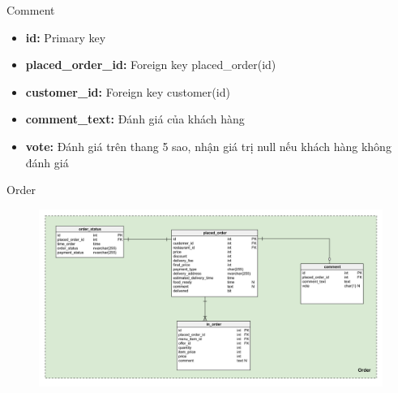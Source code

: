 \documentclass[aspectratio=43,xcolor=dvipsnames]{beamer}
\begin{document}
	\begin{frame}{Comment}
		\begin{itemize}
			\item \textbf{id:} Primary key
			\item \textbf{placed\_order\_id:} Foreign key placed\_order(id)
			\item \textbf{customer\_id:} Foreign key customer(id)
			\item \textbf{comment\_text:} Đánh giá của khách hàng
			\item \textbf{vote:} Đánh giá trên thang 5 sao, nhận giá trị null nếu khách hàng không đánh giá
		\end{itemize}
	\end{frame}
	\begin{frame}{Order}
		\begin{figure}[ht!]
			\centerline{\includegraphics[width=1\textwidth]{order.png}}
			\label{fig:ass1}
		\end{figure}
	\end{frame}
\end{document}
